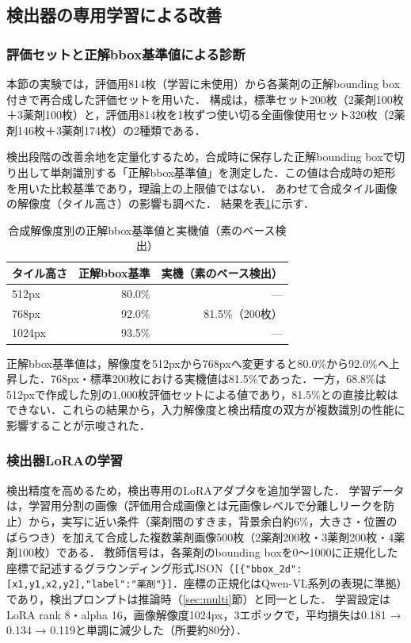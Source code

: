 \documentclass[dvipdfmx]{jsarticle}
\begin{document}
\subsection{検出器の専用学習による改善}\label{sec:detector}

\subsubsection{評価セットと正解bbox基準値による診断}

本節の実験では，評価用814枚（学習に未使用）から各薬剤の正解bounding box付きで再合成した評価セットを用いた．
構成は，標準セット200枚（2薬剤100枚＋3薬剤100枚）と，評価用814枚を1枚ずつ使い切る全画像使用セット320枚（2薬剤146枚＋3薬剤174枚）の2種類である．

検出段階の改善余地を定量化するため，合成時に保存した正解bounding boxで切り出して単剤識別する「正解bbox基準値」を測定した．この値は合成時の矩形を用いた比較基準であり，理論上の上限値ではない．
あわせて合成タイル画像の解像度（タイル高さ）の影響も調べた．
結果を表\ref{tab:a0}に示す．

\begin{table}[htbp]
\centering
\caption{合成解像度別の正解bbox基準値と実機値（素のベース検出）}
\label{tab:a0}
\begin{tabular}{lrr}
\hline
タイル高さ & 正解bbox基準 & 実機（素のベース検出） \\
\hline
512px & 80.0\% & --- \\
768px & 92.0\% & 81.5\%（200枚） \\
1024px & 93.5\% & --- \\
\hline
\end{tabular}
\end{table}

正解bbox基準値は，解像度を512pxから768pxへ変更すると80.0\%から92.0\%へ上昇した．768px・標準200枚における実機値は81.5\%であった．一方，68.8\%は512pxで作成した別の1,000枚評価セットによる値であり，81.5\%との直接比較はできない．これらの結果から，入力解像度と検出精度の双方が複数識別の性能に影響することが示唆された．

\subsubsection{検出器LoRAの学習}

検出精度を高めるため，検出専用のLoRAアダプタを追加学習した．
学習データは，学習用分割の画像（評価用合成画像とは元画像レベルで分離しリークを防止）から，実写に近い条件（薬剤間のすきま，背景余白約6\%，大きさ・位置のばらつき）を加えて合成した複数薬剤画像500枚（2薬剤200枚・3薬剤200枚・4薬剤100枚）である．
教師信号は，各薬剤のbounding boxを0〜1000に正規化した座標で記述するグラウンディング形式JSON（\texttt{[\{"bbox\_2d":[x1,y1,x2,y2],"label":"薬剤"\}]}．座標の正規化はQwen-VL系列の表現\cite{bai2023qwenvl}に準拠）であり，検出プロンプトは推論時（\ref{sec:multi}節）と同一とした．
学習設定はLoRA rank 8・alpha 16，画像解像度1024px，3エポックで，平均損失は0.181 → 0.134 → 0.119と単調に減少した（所要約80分）．
\end{document}
